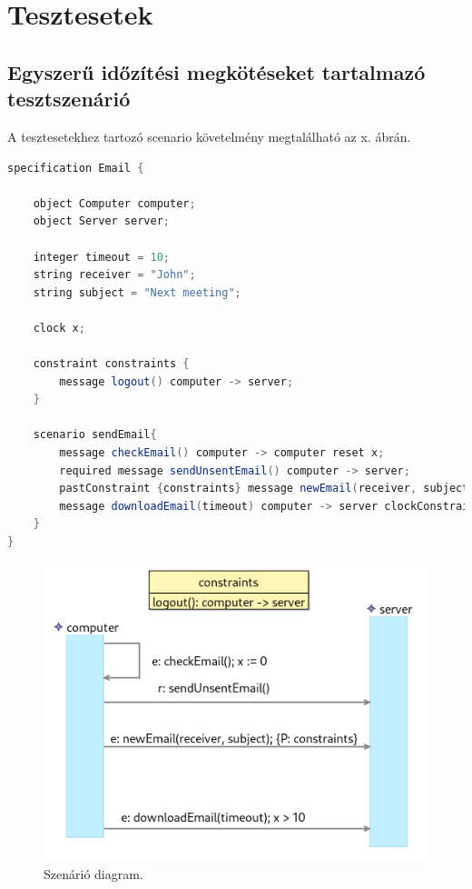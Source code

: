 \clearpage\section{Tesztesetek}\subsection{Egyszerű időzítési megkötéseket tartalmazó tesztszenárió}

A tesztesetekhez tartozó scenario követelmény megtalálható az x. ábrán.

\begin{lstlisting}[language=java, frame=single, float=ht!, caption={Integrációs teszteset.},captionpos=b]
specification Email {

	object Computer computer;
	object Server server;

	integer timeout = 10;
	string receiver = "John";
	string subject = "Next meeting";

	clock x;

	constraint constraints {
		message logout() computer -> server;
	}

	scenario sendEmail{
		message checkEmail() computer -> computer reset x;
		required message sendUnsentEmail() computer -> server;
		pastConstraint {constraints} message newEmail(receiver, subject) computer -> server;
		message downloadEmail(timeout) computer -> server clockConstraint {>(x,10)};
	}
}
\end{lstlisting}

\begin{figure}[!ht]
    \centering
    \includegraphics[width=150mm, keepaspectratio]{figures/diagramExample.png}
    \caption{Szenárió diagram.}
\end{figure}

